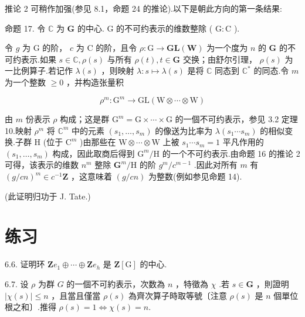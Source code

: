 \documentclass[10pt]{article}
\begin{document}
推论 2 可稍作加强(参见 8.1，命题 24 的推论).以下是朝此方向的第一条结果:

命题 17. 令 \(\mathbb{C}\) 为 \(\mathbf{G}\) 的中心. \(\mathrm{G}\) 的不可约表示的维数整除 ( \(\mathrm{G} : \mathrm{C}\) ).

令 \(g\) 为 \(\mathrm{G}\) 的阶， \(c\) 为 \(\mathrm{C}\) 的阶，且令 \(\rho  : \mathrm{G} \rightarrow  \mathbf{{GL}}\left( \mathbf{W}\right)\) 为一个度为 \(n\) 的 \(\mathbf{G}\) 的不可约表示.如果 \(s \in  \mathbb{C},\rho \left( s\right)\) 与所有 \(\rho \left( t\right) ,t \in  \mathbf{G}\) 交换；由舒尔引理， \(\rho \left( s\right)\) 为一比例算子.若记作 \(\lambda \left( s\right)\) ，则映射 \(\lambda  : s \mapsto  \lambda \left( s\right)\) 是将 \(\mathbb{C}\) 同态到 \({\mathbb{C}}^{ * }\) 的同态.令 \(m\) 为一个整数 \(\geq  0\) ，并构造张量积

\[
{\rho }^{m} : {\mathrm{G}}^{m} \rightarrow  \mathrm{{GL}}\left( {\mathrm{W} \otimes  \cdots  \otimes  \mathrm{W}}\right)
\]

由 \(m\) 份表示 \(\rho\) 构成；这是群 \({\mathrm{G}}^{m} = \mathrm{G} \times  \cdots  \times  \mathrm{G}\) 的一個不可约表示，参见 3.2 定理 10.映射 \({\rho }^{m}\) 将 \({\mathbb{C}}^{m}\) 中的元素 \(\left( {{s}_{1},\ldots ,{s}_{m}}\right)\) 的像送为比率为 \(\lambda \left( {{s}_{1}\cdots {s}_{m}}\right)\) 的相似变换.子群 \(\mathrm{H}\) (位于 \({\mathrm{C}}^{m}\) )由那些在 \(\mathrm{W} \otimes  \cdots  \otimes  \mathrm{W}\) 上被 \({s}_{1}\cdots {s}_{m} = 1\) 平凡作用的 \(\left( {{s}_{1},\ldots ,{s}_{m}}\right)\) 构成，因此取商后得到 \({\mathrm{G}}^{m}/\mathrm{H}\) 的一个不可约表示.由命题 16 的推论 2 可得，该表示的维数 \({n}^{m}\) 整除 \({\mathbf{G}}^{m}/\mathrm{H}\) 的阶 \({g}^{m}/{c}^{m - 1}\) .因此对所有 \(m\) 有 \({\left( g/cn\right) }^{m} \in  {c}^{-1}\mathbf{Z}\) ，这意味着 \(\left( {g/{cn}}\right)\) 为整数(例如参见命题 14).

(此证明归功于 J. Tate.)

\section*{练习}

6.6. 证明环 \(\mathbf{Z}{e}_{1} \oplus  \cdots  \oplus  \mathbf{Z}{e}_{h}\) 是 \(\mathbf{Z}\left\lbrack  \mathrm{G}\right\rbrack\) 的中心.

6.7. 设 \(\rho\) 为群 \(G\) 的一個不可約表示，次数為 \(n\) ，特徵為 \(\chi\) .若 \(s \in  \mathbf{G}\) ，則證明 \(\left| {\chi \left( s\right) }\right|  \leq  n\) ，且當且僅當 \(\rho \left( s\right)\) 為齊次算子時取等號〔注意 \(\rho \left( s\right)\) 是 \(n\) 個單位根之和〕.推得 \(\rho \left( s\right)  = 1 \Leftrightarrow  \chi \left( s\right)  = n.\)
\end{document}
